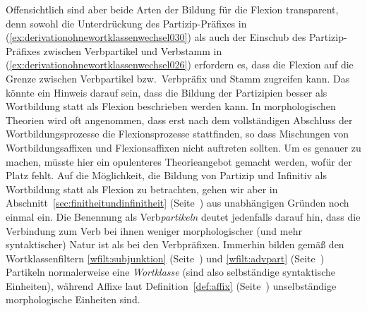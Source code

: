 \begin{exe}
\end{exe}

\label{abs:derivationohnewortklassenwechsel033}Offensichtlich sind aber beide Arten der Bildung für die Flexion transparent, denn sowohl die Unterdrückung des Partizip-Präfixes in (\ref{ex:derivationohnewortklassenwechsel030}) als auch der Einschub des Partizip-Präfixes zwischen Verbpartikel und Verbstamm in (\ref{ex:derivationohnewortklassenwechsel026}) erfordern es, dass die Flexion auf die Grenze zwischen Verbpartikel bzw.\ Verbpräfix und Stamm zugreifen kann.
Das könnte ein Hinweis darauf sein, dass die Bildung der Partizipien besser als Wortbildung statt als Flexion beschrieben werden kann.
In morphologischen Theorien wird oft angenommen, dass erst nach dem vollständigen Abschluss der Wortbildungsprozesse die Flexionsprozesse stattfinden, so dass Mischungen von Wortbildungsaffixen und Flexionsaffixen nicht auftreten sollten.
Um es genauer zu machen, müsste hier ein opulenteres Theorieangebot gemacht werden, wofür der Platz fehlt.
Auf die Möglichkeit, die Bildung von Partizip und Infinitiv als Wortbildung statt als Flexion zu betrachten, gehen wir aber in Abschnitt~\ref{sec:finitheitundinfinitheit} (Seite~\pageref{abs:finitheitundinfinitheit063}) aus unabhängigen Gründen noch einmal ein.
Die Benennung als Verb\textit{partikeln} deutet jedenfalls darauf hin, dass die Verbindung zum Verb bei ihnen weniger morphologischer (und mehr syntaktischer) Natur ist als bei den Verbpräfixen.
Immerhin bilden gemäß den Wortklassenfiltern \ref{wfilt:subjunktion} (Seite~\pageref{wfilt:subjunktion}) und \ref{wfilt:advpart} (Seite~\pageref{wfilt:advpart}) Partikeln normalerweise eine \textit{Wortklasse} (sind also selbständige syntaktische Einheiten), während Affixe laut Definition~\ref{def:affix} (Seite~\pageref{def:affix}) unselbständige morphologische Einheiten sind.

